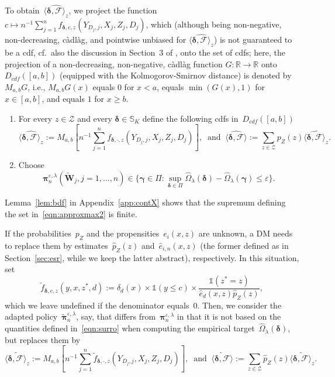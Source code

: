 \documentclass[11pt, a4paper]{article}
\newcommand{\R}{\mathbb{R}}
\theoremstyle{definition}
\begin{document}
To obtain~$\widehat{\langle \bm{\delta}, \mathcal{F} \rangle_z}$, we project the function~$c \mapsto n^{-1} \sum_{j = 1}^n f_{\bm{\delta}, c, z}(Y_{D_j, j}, X_j, Z_j, D_j)$, which (although being non-negative, non-decreasing, càdlàg, and pointwise unbiased for $\widehat{\langle \bm{\delta}, \mathcal{F} \rangle_z}$) is not guaranteed to be a cdf, cf.~also the discussion in Section~3 of \cite{kitagawa2019equality}, onto the set of cdfs; here, the projection of a non-decreasing, non-negative, càdlàg function $G: \R \to \R$ onto $D_{cdf}([a,b])$ (equipped with the Kolmogorov-Smirnov distance) is denoted by $M_{a,b}G$, i.e., $M_{a,b}G(x)$ equals $0$ for $x < a$, equals $\min(G(x), 1)$ for $x \in [a,b]$, and equals $1$ for $x \geq b$.
%
\begin{enumerate}
\item For every $z \in \mathcal{Z}$ and every $\bm{\delta} \in \mathbb{S}_K$ define the following cdfs in~$D_{cdf}([a,b])$ \begin{equation}\label{eqn:surro}
\widehat{\langle \bm{\delta}, \mathcal{F} \rangle_z} := M_{a,b} \left[n^{-1} \sum_{j = 1}^n f_{\bm{\delta}, \cdot, z}(Y_{D_j, j}, X_j, Z_j, D_j) \right], ~ \text{ and } ~ \widehat{\langle \bm{\delta}, \mathcal{F} \rangle} := \sum_{z \in \mathcal{Z}} p_Z(z) \widehat{\langle \bm{\delta}, \mathcal{F} \rangle_{z}}.
\end{equation} 
\item Choose
\begin{equation}\label{eqn:approxmax2}
\bm{\pi}^{\varepsilon, \lambda}_n(\tilde{\bm{W}}_j, j = 1, \hdots, n) \in \bigg\{\bm{\gamma} \in \Pi : \sup_{\bm{\delta} \in \Pi} \hat{\Omega}_{\lambda}(\bm{\delta}) - \hat{\Omega}_{\lambda}(\bm{\gamma}) \leq \varepsilon\bigg\}.
\end{equation}
\end{enumerate}

Lemma~\ref{lem:bdf} in Appendix~\ref{app:contX} shows that the supremum defining the set in~\eqref{eqn:approxmax2} is finite.

If the probabilities~$p_Z$ and the propensities~$e_i(x,z)$ are unknown, a DM needs to replace them by estimates~$\hat{p}_Z(z)$ and~$\hat{e}_{i,n}(x, z)$ (the former defined as in Section~\ref{sec:esr}, while we keep the latter abstract), respectively. In this situation, set $$\tilde{f}_{\bm{\delta}, c, z}(y, x, z^*, d) := \delta_d(x) \times \mathds{1}(y \leq c) \times \frac{\mathds{1}( z^* = z)}{\hat{e}_d(x, z) \hat{p}_Z(z)},$$ which we leave undefined if the denominator equals~$0$. Then, we consider the adapted policy~$\tilde{\bm{\pi}}^{\varepsilon,   \lambda}_n$, say, that differs from~$\bm{\pi}^{\varepsilon, \lambda}_n$ in that it is not based on the quantities defined in~\eqref{eqn:surro} when computing the empirical target~$\hat{\Omega}_{\lambda}(\bm{\delta})$, but replaces them by
\begin{equation}\label{eqn:surro2}
\widetilde{\langle \bm{\delta}, \mathcal{F} \rangle_z} := M_{a,b} \left[n^{-1} \sum_{j = 1}^n \tilde{f}_{\bm{\delta}, \cdot, z}(Y_{D_j, j}, X_j, Z_j, D_j) \right], ~ \text{ and } ~ \widetilde{\langle \bm{\delta}, \mathcal{F} \rangle} := \sum_{z \in \mathcal{Z}} \hat{p}_Z(z) \widetilde{\langle \bm{\delta}, \mathcal{F} \rangle_z}.
\end{equation}
\end{document}
